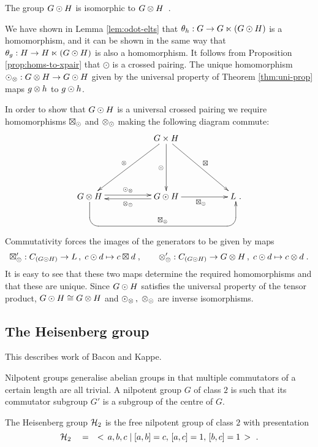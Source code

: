 \begin{thm}
The group  $G \odot H$  is isomorphic to  $G \otimes H$~.
\end{thm}
\begin{pf}
We have shown in Lemma \ref{lem:odot-elts} that  
$\theta_h : G \to G \ltimes (G \odot H)$  is a homomorphism,
and it can be shown in the same way that  
$\theta_g : H \to H \ltimes (G \odot H)$  is also a homomorphism.  
It follows from Proposition \ref{prop:homs-to-xpair}
that  $\odot$  is a crossed pairing.
The unique homomorphism  $\odot_{\otimes} : G \otimes H \to G \odot H$
given by the universal property of Theorem \ref{thm:uni-prop}
maps  $g \otimes h$  to  $g \odot h$.

In order to show that  $G \odot H$  is a universal crossed pairing
we require homomorphisms  $\boxtimes_{\odot}$  and  $\otimes_{\odot}$
making the following diagram commute:
$$
\xymatrix{ 
   &&  \ugxh \ar[ddll]_{\ot} \ar[dd]_{\odot} \ar[ddrr]^{\bt}
      &&  \\
   && &&  \\
 \ugth  \ar[rr]<+0.5ex>^{\odot_{\ot}}
   \ar `d[1,4] `[rrrr]^{\bt_{\ot}} [rrrr]
   &&  \ugoh  \ar[ll]<+0.5ex>^{\ot_{\odot}} \ar[rr]_{\bt_{\odot}}
      &&  L ~. \\
   && &&
}
$$
Commutativity forces the images of the generators to be given by maps
$$
\boxtimes'_{\odot} : C_{(G \odot H)} \to L\,,\;      c \odot d \mapsto c \boxtimes d\;, \qquad
\otimes'_{\odot} : C_{(G \odot H)} \to G \otimes H\,,\;  c \odot d \mapsto c \otimes d\;.
$$
It is easy to see that these two maps determine the required homomorphisms
and that these are unique.
Since  $G \odot H$  satisfies the universal property of the tensor product,
$G \odot H \cong G \otimes H$  and 
$\odot_{\otimes}\,,\;\otimes_{\odot}$  are inverse isomorphisms.
\end{pf}



\subsection{The Heisenberg group}

This describes work of Bacon and Kappe.

Nilpotent groups generalise abelian groups in that multiple commutators
of a certain length are all trivial.
A nilpotent group  $G$  of class $2$ is such that its commutator subgroup
$G'$  is a subgroup of the centre of  $G$.

The Heisenberg group  $\mathcal{H}_2$  is the free nilpotent group of class $2$
with presentation
$$
\mathcal{H}_2 \quad = \quad <\,a,b,c \;|\; [a,b]=c,\,[a,c]=1,\,[b,c]=1\,>~.
$$

